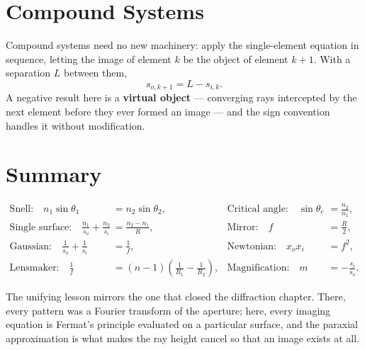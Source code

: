 \section{Compound Systems}

Compound systems need no new machinery: apply the single-element equation in sequence, letting the image of element $k$ be the object of element $k+1$. With a separation $L$ between them,
\begin{equation}
    s_{o,k+1} = L - s_{i,k}.
\end{equation}
A negative result here is a \textbf{virtual object} --- converging rays intercepted by the next element before they ever formed an image --- and the sign convention handles it without modification.

\section{Summary}

\begin{fact}
\begin{align}
    \text{Snell:}\quad n_1\sin\theta_1 &= n_2\sin\theta_2,
    &\text{Critical angle:}\quad \sin\theta_c &= \frac{n_2}{n_1}, \\
    \text{Single surface:}\quad \frac{n_1}{s_o} + \frac{n_2}{s_i} &= \frac{n_2-n_1}{R},
    &\text{Mirror:}\quad f &= \frac{R}{2}, \\
    \text{Gaussian:}\quad \frac{1}{s_o} + \frac{1}{s_i} &= \frac{1}{f},
    &\text{Newtonian:}\quad x_o x_i &= f^2, \\
    \text{Lensmaker:}\quad \frac{1}{f} &= (n-1)\left(\frac{1}{R_1}-\frac{1}{R_2}\right),
    &\text{Magnification:}\quad m &= -\frac{s_i}{s_o}.
\end{align}
\end{fact}

The unifying lesson mirrors the one that closed the diffraction chapter. There, every pattern was a Fourier transform of the aperture; here, every imaging equation is Fermat's principle evaluated on a particular surface, and the paraxial approximation is what makes the ray height cancel so that an image exists at all.
